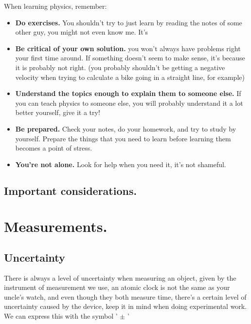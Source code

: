 \documentclass[11pt,fleqn]{book} %
\begin{document}
When learning physics, remember:
\begin{itemize}
    \item \textbf{Do exercises.} You shouldn't try to just learn by reading the notes of some other
    guy, you might not even know me. It's 
    \item \textbf{Be critical of your own solution.} you won't always have problems right your first time
    around. If something doesn't seem to make sense, it's because it is probably not right. 
    (you probably shouldn't be getting a negative velocity when trying to calculate a bike going in a
    straight line, for example)
    \item \textbf{Understand the topics enough to explain them to someone else.} If you can teach physics to
    someone else, you will probably understand it a lot better yourself, give it a try!
    \item \textbf{Be prepared.} Check your notes, do your homework, and try to study by yourself. Prepare the things that
    you need to learn before learning them becomes a point of stress.
    \item \textbf{You're not alone.} Look for help when you need it, it's not shameful.
\end{itemize}

\vspace{20px}

\section{Important considerations.}


\chapter{Measurements.}



\section{Uncertainty}

There is always a level of uncertainty when measuring an object, given by the instrument of
measurement we use, an atomic clock is not the same as your uncle's watch, and even though they both
measure time, there's a certain level of uncertainty caused by the device, keep it in mind when doing experimental
work. We can express this with the symbol ' $\pm$ '
\end{document}
